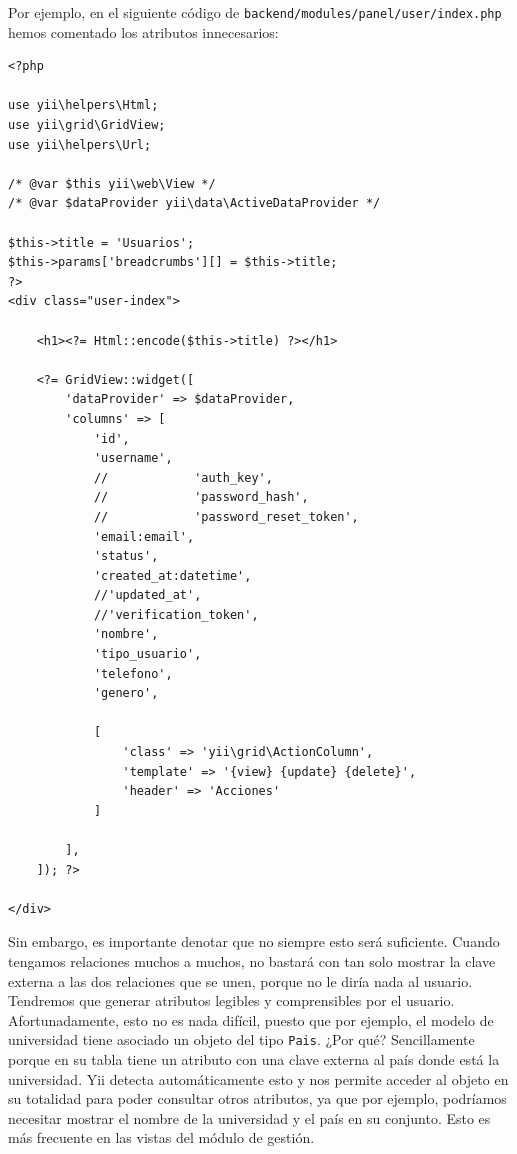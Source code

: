Por ejemplo, en el siguiente código de \texttt{backend/modules/panel/user/index.php} hemos comentado los atributos innecesarios:

\begin{verbatim}
<?php

use yii\helpers\Html;
use yii\grid\GridView;
use yii\helpers\Url;

/* @var $this yii\web\View */
/* @var $dataProvider yii\data\ActiveDataProvider */

$this->title = 'Usuarios';
$this->params['breadcrumbs'][] = $this->title;
?>
<div class="user-index">
	
	<h1><?= Html::encode($this->title) ?></h1>
	
	<?= GridView::widget([
		'dataProvider' => $dataProvider,
		'columns' => [
			'id',
			'username',
			//            'auth_key',
			//            'password_hash',
			//            'password_reset_token',
			'email:email',
			'status',
			'created_at:datetime',
			//'updated_at',
			//'verification_token',
			'nombre',
			'tipo_usuario',
			'telefono',
			'genero',
		
			[
				'class' => 'yii\grid\ActionColumn',
				'template' => '{view} {update} {delete}',
				'header' => 'Acciones'
			]
	
		],
	]); ?>

</div>

\end{verbatim}

Sin embargo, es importante denotar que no siempre esto será suficiente. Cuando tengamos relaciones muchos a muchos, no bastará con tan solo mostrar la clave externa a las dos relaciones que se unen, porque no le diría nada al usuario. Tendremos que generar atributos legibles y comprensibles por el usuario. Afortunadamente, esto no es nada difícil, puesto que por ejemplo, el modelo de universidad tiene asociado un objeto del tipo \texttt{Pais}. ¿Por qué? Sencillamente porque en su tabla tiene un atributo con una clave externa al país donde está la universidad. Yii detecta automáticamente esto y nos permite acceder al objeto en su totalidad para poder consultar otros atributos, ya que por ejemplo, podríamos necesitar mostrar el nombre de la universidad y el país en su conjunto. Esto es más frecuente en las vistas del módulo de gestión.

